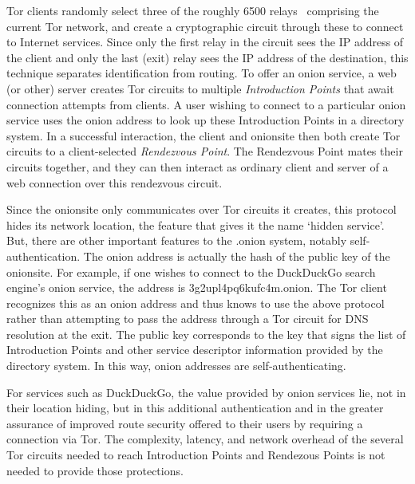 \documentclass[10pt, conference, compsocconf]{styles/IEEEtran}
\begin{document}
Tor clients randomly select three of the roughly 6500 relays~\cite{tor-network-size}
comprising the current Tor network, and create a cryptographic circuit
through these to connect to Internet services. Since only the first
relay in the circuit sees the IP address of the client and
only the last (exit) relay sees the IP address of the destination,
this technique separates identification from routing.
To offer an onion service, a web (or other) server creates Tor circuits to
multiple \emph{Introduction Points} that await connection attempts
from clients. A user wishing to connect to a particular onion service
uses the onion address to look up these Introduction Points in a
directory system. In a successful interaction, the client and
onionsite then both create Tor circuits to a client-selected
\emph{Rendezvous Point}. The Rendezvous Point mates their circuits
together, and they can then interact as ordinary client and server of
a web connection over this rendezvous circuit.

Since the onionsite only communicates over Tor circuits it creates,
this protocol hides its network location, the feature that
gives it the name `hidden service'. But, there are other important
features to the .onion system, notably self-authentication. The onion
address is actually the hash of the public key of the onionsite. For
example, if one wishes to connect to the DuckDuckGo search engine's
onion service, the address is 3g2upl4pq6kufc4m.onion. The Tor client
recognizes this as an onion address and thus knows to use the above
protocol rather than attempting to pass the address through a Tor
circuit for DNS resolution at the exit. The public key
corresponds to the key that signs the list of Introduction Points
and other service descriptor information provided by the directory
system. In this way, onion addresses are self-authenticating.


For services such as DuckDuckGo, the value provided by onion services
lie, not in their location hiding, but in this additional
authentication and in the greater assurance of improved route security
offered to their users by requiring a connection via Tor. The
complexity, latency, and network overhead of the several Tor circuits
needed to reach Introduction Points and Rendezous Points is not needed
to provide those protections.
\end{document}
